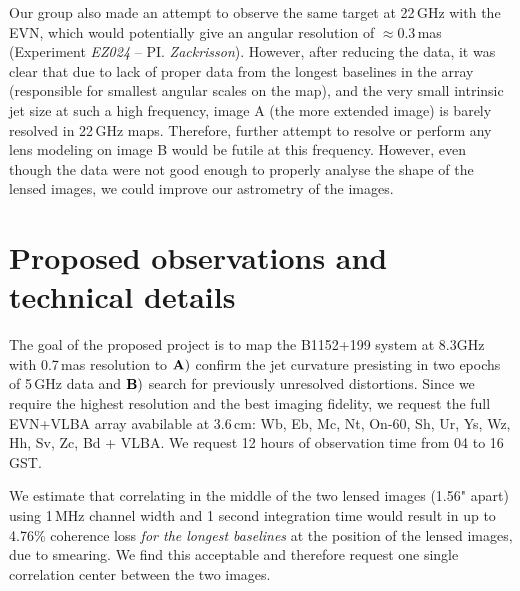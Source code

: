 \documentclass[a4paper, 11pt]{article}
\begin{document}
Our group also made an attempt to observe the same target at 22\,GHz with the EVN, which would potentially give an angular resolution of $\approx 0.3$\,mas (Experiment \emph{EZ024} -- PI. \emph{Zackrisson}). However, after reducing the data, it was clear that due to lack of proper data from the longest baselines in the array (responsible for smallest angular scales on the map), and the very small intrinsic jet size at such a high frequency, image A (the more extended image) is barely resolved in 22\,GHz maps. Therefore, further attempt to resolve or perform any lens modeling on image B would be futile at this frequency. However, even though the data were not good enough to properly analyse the shape of the lensed images, we could improve our astrometry of the images.

\section{Proposed observations and technical details}

The goal of the proposed project is to map the B1152+199 system at 8.3GHz with 0.7\,mas resolution to $\bf A)$ confirm the jet curvature presisting in two epochs of 5\,GHz data and $\bf B)$ search for previously unresolved distortions. Since we require the highest resolution and the best imaging fidelity, we request the full EVN+VLBA array avabilable at 3.6\,cm: Wb, Eb, Mc, Nt, On-60, Sh, Ur, Ys, Wz, Hh, Sv, Zc, Bd + VLBA. We request 12 hours of observation time from 04 to 16\,GST. 


We estimate that correlating in the middle of the two lensed images (1.56" apart) using 1\,MHz channel width and 1 second integration time would result in up to 4.76\% coherence loss \emph{for the longest baselines} at the position of the lensed images, due to smearing. We find this acceptable and therefore request one single correlation center between the two images.
\end{document}
